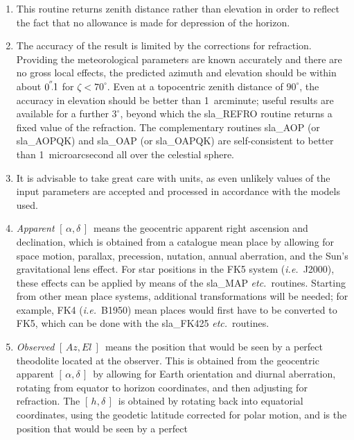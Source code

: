 \documentclass[11pt,twoside]{article}
\newcommand{\radec}     {$[\,\alpha,\delta\,]$}
\newcommand{\hadec}     {$[\,h,\delta\,]$}
\newcommand{\azel}      {$[\,Az,El~]$}
\newcommand{\arcsec}[2] {\arcseci{#1}$\hspace{-0.4em}.#2$}
\newcommand{\arcsec}[2] {
      {$#1\hspace{-0.05em}^{'\hspace{-0.1em}'}\hspace{-0.4em}.#2$}
   }
\newcommand{\arcseci}[1] {$#1\hspace{-0.05em}$\raisebox{-0.5ex}
                         {$^{'\hspace{-0.1em}'}$}}
\renewcommand{\arcseci}[1] {$#1\hspace{-0.05em}^{'\hspace{-0.1em}'}$}
\begin{document}
{
 \begin{enumerate}
  \item This routine returns zenith distance rather than elevation
        in order to reflect the fact that no allowance is made for
        depression of the horizon.
  \item The accuracy of the result is limited by the corrections for
        refraction.  Providing the meteorological parameters are
        known accurately and there are no gross local effects, the
        predicted azimuth and elevation should be within about
        \arcsec{0}{1} for $\zeta<70^{\circ}$.  Even
        at a topocentric zenith distance of
        $90^{\circ}$, the accuracy in elevation should be better than
        1~arcminute;  useful results are available for a further
        $3^{\circ}$, beyond which the sla\_REFRO routine returns a
        fixed value of the refraction.  The complementary
        routines sla\_AOP (or sla\_AOPQK) and sla\_OAP (or sla\_OAPQK)
        are self-consistent to better than 1~microarcsecond all over
        the celestial sphere.
  \item It is advisable to take great care with units, as even
        unlikely values of the input parameters are accepted and
        processed in accordance with the models used.
  \item {\it Apparent}\/ \radec\ means the geocentric apparent right ascension
        and declination, which is obtained from a catalogue mean place
        by allowing for space motion, parallax, precession, nutation,
        annual aberration, and the Sun's gravitational lens effect.  For
        star positions in the FK5 system ({\it i.e.}\ J2000), these effects can
        be applied by means of the sla\_MAP {\it etc.}\ routines.  Starting from
        other mean place systems, additional transformations will be
        needed;  for example, FK4 ({\it i.e.}\ B1950) mean places would first
        have to be converted to FK5, which can be done with the
        sla\_FK425 {\it etc.}\ routines.
  \item {\it Observed}\/ \azel\ means the position that would be seen by a
        perfect theodolite located at the observer.  This is obtained
        from the geocentric apparent \radec\ by allowing for Earth
        orientation and diurnal aberration, rotating from equator
        to horizon coordinates, and then adjusting for refraction.
        The \hadec\ is obtained by rotating back into equatorial
        coordinates, using the geodetic latitude corrected for polar
        motion, and is the position that would be seen by a perfect

\end{enumerate}}
\end{document}
